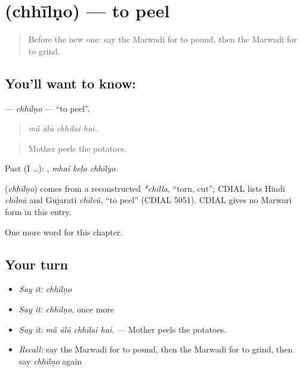 \section[\texorpdfstring{\mw{छीलणो} (chhīlṇo)}{छीलणो (chhīlṇo)}]{ (chhīlṇo) — to peel}

\label{lesson:MW-C179-chhilno}



\begin{quote}
Before the new one: say the Marwadi for to pound, then the Marwadi for to grind.
\end{quote}

\subsection*{You'll want to know: }
\textbf{} — \emph{chhīlṇo} — \textquotedblleft{}to peel\textquotedblright{}.

\begin{quote}
   
\end{quote}

\begin{quote}
\emph{mā̃ ālū chhīlai hai.}
\end{quote}

\begin{quote}
Mother peels the potatoes.
\end{quote}

Past (I …):   , \emph{mhaĩ keḷo chhīlyo}.

\begin{cousinweb}
\textbf{} (\emph{chhīlṇo}) comes from a reconstructed \emph{*chilla}, \textquotedblleft{}torn, cut\textquotedblright{}; CDIAL lists Hindi \emph{chīlnā} and Gujarati \emph{chilvũ}, \textquotedblleft{}to peel\textquotedblright{} (CDIAL 5051). CDIAL gives no Marwari form in this entry.
\end{cousinweb}

\begin{grammarlens}[title={What you've built}]
One more word for this chapter.
\end{grammarlens}

\subsection*{Your turn}
\begin{itemize}
\raggedright
  \item \emph{Say it:} \emph{chhīlṇo}
  \item \emph{Say it:} \emph{chhīlṇo}, once more
  \item \emph{Say it:} \emph{mā̃ ālū chhīlai hai.} — Mother peels the potatoes.
  \item \emph{Recall:} say the Marwadi for to pound, then the Marwadi for to grind, then say \emph{chhīlṇo} again
\end{itemize}

